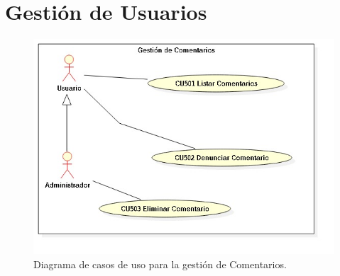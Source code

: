 \section{Gesti\'{o}n de Usuarios}

\begin{figure}[h]
\centering
\includegraphics[width=1\textwidth]{Img/CasosDeUso/DCU05.jpg}
\caption{Diagrama de casos de uso para la gesti\'{o}n de Comentarios.}
\label{fig:dcu}
\end{figure}
